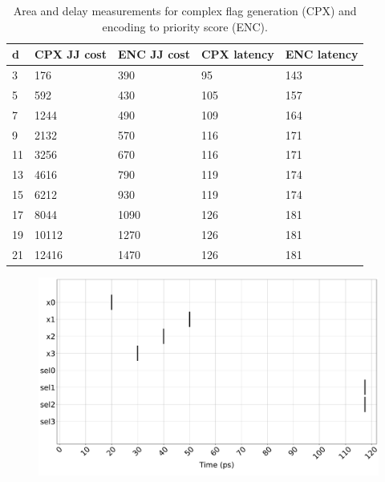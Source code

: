 \begin{table}[]
\caption{Area and delay measurements for complex flag generation (CPX) and encoding to priority score (ENC).}
\label{tab:encoderstats}
\begin{tabular}{|l|l|l|l|l|}
\hline
d  & CPX JJ cost & ENC JJ cost & CPX latency & ENC latency \\ \hline
3  & 176         & 390         & 95          & 143         \\ \hline
5  & 592         & 430         & 105         & 157         \\ \hline
7  & 1244        & 490         & 109         & 164         \\ \hline
9  & 2132        & 570         & 116         & 171         \\ \hline
11 & 3256        & 670         & 116         & 171         \\ \hline
13 & 4616        & 790         & 119         & 174         \\ \hline
15 & 6212        & 930         & 119         & 174         \\ \hline
17 & 8044        & 1090        & 126         & 181         \\ \hline
19 & 10112       & 1270        & 126         & 181         \\ \hline
21 & 12416       & 1470        & 126         & 181         \\ \hline
\end{tabular}
\end{table}

\begin{figure}
  \begin{center}
    \includegraphics[width=\columnwidth]{figures/arbi.pdf}
  \end{center}
  \caption{}\label{fig:pylserun}
\end{figure}

